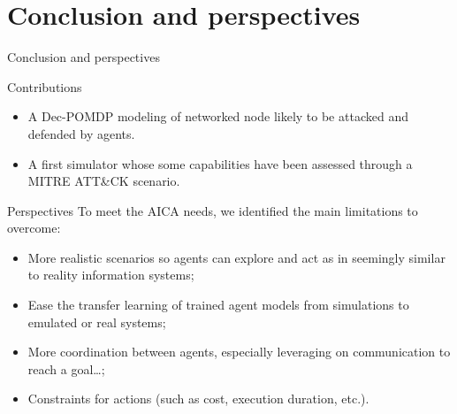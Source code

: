 \section{Conclusion and perspectives}
	\begin{frame}{Conclusion and perspectives}
		{}

            \begin{block}{Contributions}
                \begin{itemize}
                    \item A Dec-POMDP modeling of networked node likely to be attacked and defended by agents.
                    \item A first simulator whose some capabilities have been assessed through a MITRE ATT\&CK scenario.
                \end{itemize}
            \end{block}

            \begin{alertblock}{Perspectives}
                To meet the AICA needs, we identified the main limitations to overcome:

                \begin{itemize}
                    \item More realistic scenarios so agents can explore and act as in seemingly similar to reality information systems;
                    \item Ease the transfer learning of trained agent models from simulations to emulated or real systems;
                    \item More coordination between agents, especially leveraging on communication to reach a goal\dots;
                    \item Constraints for actions (such as cost, execution duration, etc.).
                \end{itemize}
            
            \end{alertblock}
	
	\end{frame}






